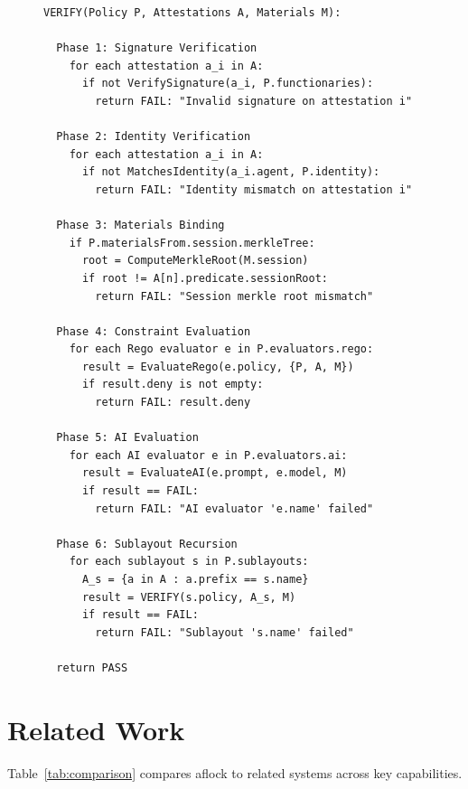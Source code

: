 \documentclass[11pt,a4paper]{article}
\begin{document}
\begin{figure}[t]
\begin{lstlisting}[basicstyle=\ttfamily\small,frame=single,caption={aflock Verification Algorithm},label={alg:verify}]
VERIFY(Policy P, Attestations A, Materials M):

  Phase 1: Signature Verification
    for each attestation a_i in A:
      if not VerifySignature(a_i, P.functionaries):
        return FAIL: "Invalid signature on attestation i"

  Phase 2: Identity Verification
    for each attestation a_i in A:
      if not MatchesIdentity(a_i.agent, P.identity):
        return FAIL: "Identity mismatch on attestation i"

  Phase 3: Materials Binding
    if P.materialsFrom.session.merkleTree:
      root = ComputeMerkleRoot(M.session)
      if root != A[n].predicate.sessionRoot:
        return FAIL: "Session merkle root mismatch"

  Phase 4: Constraint Evaluation
    for each Rego evaluator e in P.evaluators.rego:
      result = EvaluateRego(e.policy, {P, A, M})
      if result.deny is not empty:
        return FAIL: result.deny

  Phase 5: AI Evaluation
    for each AI evaluator e in P.evaluators.ai:
      result = EvaluateAI(e.prompt, e.model, M)
      if result == FAIL:
        return FAIL: "AI evaluator 'e.name' failed"

  Phase 6: Sublayout Recursion
    for each sublayout s in P.sublayouts:
      A_s = {a in A : a.prefix == s.name}
      result = VERIFY(s.policy, A_s, M)
      if result == FAIL:
        return FAIL: "Sublayout 's.name' failed"

  return PASS
\end{lstlisting}
\end{figure}

\section{Related Work}

Table~\ref{tab:comparison} compares aflock to related systems across key capabilities.
\end{document}
